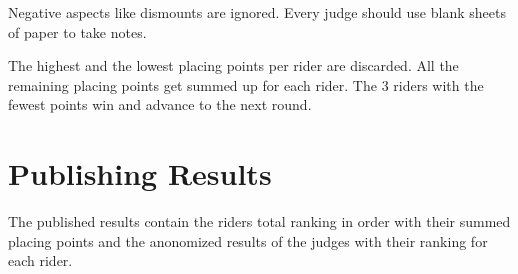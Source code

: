 Negative aspects like dismounts are ignored.
Every judge should use blank sheets of paper to take notes.

The highest and the lowest placing points per rider are discarded.
All the remaining placing points get summed up for each rider.
The 3 riders with the fewest points win and advance to the next round.

\section{Publishing Results}
The published results contain the riders total ranking in order with their summed placing points and the anonomized results of the judges with their ranking for each rider.
